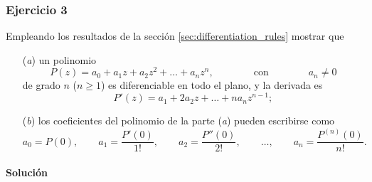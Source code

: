 \documentclass[a4paper]{report}
\begin{document}
\subsubsection{Ejercicio 3}

Empleando los resultados de la sección \ref{sec:differentiation_rules} mostrar que 
\begin{enumerate}
 \item[(\textit{a})] un polinomio
 \[
  P(z)=a_0+a_1z+a_2z^2+\dots+a_nz^n,\qquad\qquad\textrm{con}\qquad\qquad a_n\neq0
 \]
 de grado \(n\) (\(n\geq1\)) es diferenciable en todo el plano, y la derivada es
 \[
  P'(z)=a_1+2a_2z+\dots+na_nz^{n-1};
 \]
 \item[(\textit{b})] los coeficientes del polinomio de la parte (\textit{a}) pueden escribirse como 
 \[
  a_0=P(0),\qquad a_1=\frac{P'(0)}{1!},\qquad a_2=\frac{P''(0)}{2!},\qquad\dots,\qquad a_n=\frac{P^{(n)}(0)}{n!}.
 \]
\end{enumerate}

\paragraph{Solución}
\end{document}
